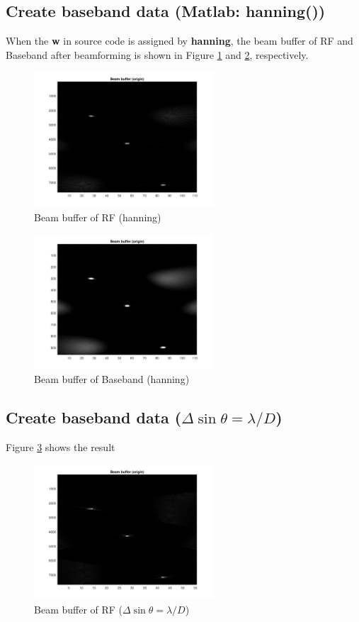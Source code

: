 \documentclass{article}
\begin{document}
\subsection{Create baseband data (Matlab: hanning())}
When the \textbf{w} in source code is assigned by \textbf{hanning}, the beam buffer of RF and Baseband after beamforming is shown in
Figure \ref{fig:RF-hanning} and \ref{fig:Base-hanning}, respectively.
\begin{figure}[H]
    \centering
    \includegraphics[width=0.6\textwidth]{src/RF/b-3-hanning.pdf}
    \caption{Beam buffer of RF (hanning)}
    \label{fig:RF-hanning}
\end{figure}
\begin{figure}[H]
    \centering
    \includegraphics[width=0.6\textwidth]{src/Base/b-4-hanning.pdf}
    \caption{Beam buffer of Baseband (hanning)}
    \label{fig:Base-hanning}
\end{figure}


\subsection{Create baseband data ($\Delta \sin \theta = \lambda / D$)}
Figure \ref{fig:RF-ones-1D} shows the result
\begin{figure}[H]
    \centering
    \includegraphics[width=0.6\textwidth]{src/RF/b-3-ones-1D.pdf}
    \caption{Beam buffer of RF ($\Delta \sin \theta = \lambda / D$)}
    \label{fig:RF-ones-1D}
\end{figure}
\end{document}
